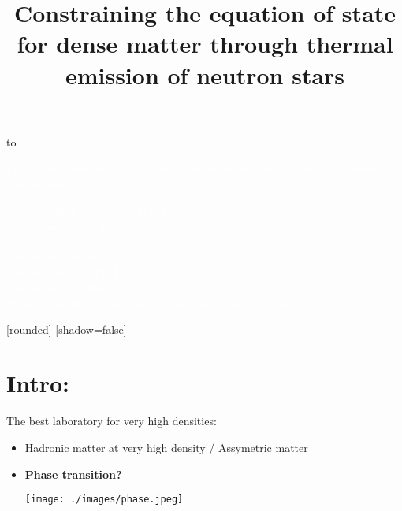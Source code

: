 \documentclass[francais]{beamer}
\title[Nicolas Baillot d'Etivaux]{Constraining the equation of state for dense matter through thermal emission of neutron stars}
\begin{document}


\null

\vspace{-0.5cm}
\begin{frame}
	\hbox to 
	
\begin{center}
\textcolor{white}{\Large{Constraining the equation of state for dense matter through thermal emission of neutron stars}}\\[+0.5cm]
\end{center}


\vspace{+1cm}
\textcolor{white}{Nicolas Baillot d'Etivaux - IPN Lyon}\\
\textcolor{white}{QGP-France 2016, Etretat}\\[+0.5cm]
\textcolor{white}{in collaboration with:} \\
\textcolor{white}{Jérôme Margueron - IPN Lyon } \\
\textcolor{white}{Hubert Hansen - IPN Lyon } \\		
\textcolor{white}{Natalie Webb - IRAP} \\
\textcolor{white}{Sébastien Guillot - Pontificia Universidad Católica de Chile} \\
\end{frame}

\usebackgroundtemplate{}











[rounded]%
[shadow=false]

\color{white}



\section{Intro:}


\begin{frame}{The best laboratory for very high densities:}
	\begin{itemize}
	\color{white}
	\item Hadronic matter at very high density / Assymetric matter
	\item \textbf{Phase transition?}
\vspace{+0.3cm}	
\begin{center}
\texttt{[image: ./images/phase.jpeg]}
\end{center}
\end{itemize}
\end{frame}
\end{document}
